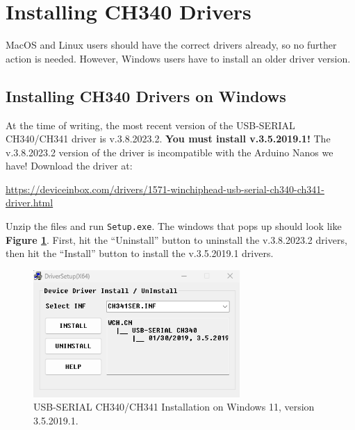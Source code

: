 \documentclass{article}
\begin{document}



\section{Installing CH340 Drivers}

MacOS and Linux users should have the correct drivers already, so no further action is needed. However, Windows users have to install an older driver version.

\subsection{Installing CH340 Drivers on Windows}

At the time of writing, the most recent version of the USB-SERIAL CH340/CH341 driver is v.3.8.2023.2. {\bf You must install v.3.5.2019.1!} The v.3.8.2023.2 version of the driver is incompatible with the Arduino Nanos we have! Download the driver at:
\begin{center}
    \url{https://deviceinbox.com/drivers/1571-winchiphead-usb-serial-ch340-ch341-driver.html}
\end{center}

Unzip the files and run \verb|Setup.exe|. The windows that pops up should look like {\bf Figure \ref{fig:windows-driver-setup}}. First, hit the ``Uninstall'' button to uninstall the v.3.8.2023.2 drivers, then hit the ``Install'' button to install the  v.3.5.2019.1 drivers.

\begin{figure}[ht]
    \centering
    \includegraphics[width = 0.7\textwidth]{images/windows-driver-setup.png}
    \cprotect\caption{USB-SERIAL CH340/CH341 Installation on Windows 11, version 3.5.2019.1.}
    \label{fig:windows-driver-setup}
\end{figure}
\end{document}
